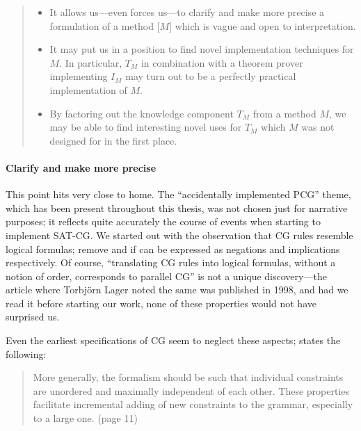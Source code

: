 \begin{quote}
\begin{itemize}
\item It allows us---even forces us---to clarify and make more precise a formulation of a method [$M$] which is vague and open to interpretation.
\item It may put us in a position to find novel implementation techniques for $M$. 
In particular, $T_M$ in combination with a theorem prover implementing $I_M$ may turn out to be a perfectly practical implementation of $M$.
\item By factoring out the knowledge component $T_M$ from a method $M$, 
we may be able to find interesting novel uses for $T_M$ which $M$ was not designed for in the first place.
\end{itemize}
\end{quote}


\paragraph{Clarify and make more precise} This point hits very close to home.
The ``accidentally implemented PCG'' theme, which has been present throughout this thesis, was not chosen just for narrative purposes; it reflects quite accurately the course of events when starting to implement SAT-CG.
We started out with the observation that CG rules resemble logical formulas; {\sc remove} and {\sc if } can be expressed as negations and implications respectively. 
Of course, ``translating CG rules into logical formulas, without a notion of order, corresponds to parallel CG'' is not a unique discovery---the article where Torbjörn Lager noted the same \cite{lager98} was published in 1998, and had we read it before starting our work, none of these properties would not have surprised us.


Even the earliest specifications of CG seem to neglect these aspects;
\cite{karlsson1995constraint} states the following: %


\begin{quote}
More generally, the formalism should be such that individual constraints are unordered and maximally independent of each other. These properties facilitate incremental adding of new constraints to the grammar, especially to a large one. (page 11)
\end{quote}

